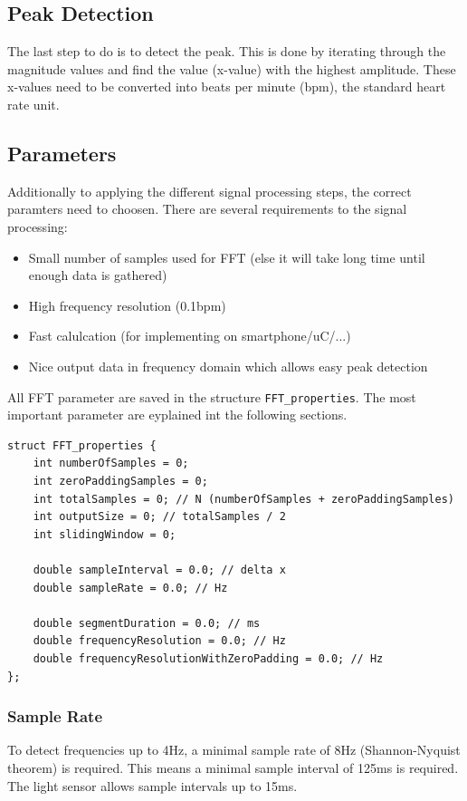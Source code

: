 \documentclass[notitlepage]{scrreprt}
\begin{document}
\subsection{Peak Detection}
The last step to do is to detect the peak. This is done by iterating through the magnitude values and find the value (x-value) with the highest amplitude. These x-values need to be converted into beats per minute (bpm), the standard heart rate unit.

\subsection{Parameters}
Additionally to applying the different signal processing steps, the correct paramters need to choosen. There are several requirements to the signal processing:
\begin{itemize}
	\item{Small number of samples used for FFT (else it will take long time until enough data is gathered)}
	\item{High frequency resolution (0.1bpm)}
	\item{Fast calulcation (for implementing on smartphone/uC/...)}
	\item{Nice output data in frequency domain which allows easy peak detection}\\
\end{itemize}

All FFT parameter are saved in the structure \lstinline{FFT_properties}. The most important parameter are eyplained int the following sections.

\begin{lstlisting}
struct FFT_properties {
    int numberOfSamples = 0;
    int zeroPaddingSamples = 0;
    int totalSamples = 0; // N (numberOfSamples + zeroPaddingSamples)
    int outputSize = 0; // totalSamples / 2
    int slidingWindow = 0;

    double sampleInterval = 0.0; // delta x
    double sampleRate = 0.0; // Hz

    double segmentDuration = 0.0; // ms
    double frequencyResolution = 0.0; // Hz
    double frequencyResolutionWithZeroPadding = 0.0; // Hz
};
\end{lstlisting}

\subsubsection{Sample Rate}
To detect frequencies up to 4Hz, a minimal sample rate of 8Hz (Shannon-Nyquist theorem) is required.
This means a minimal sample interval of 125ms is required. The light sensor allows sample intervals up to 15ms.
\end{document}
